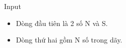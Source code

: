Input
\begin{itemize}
	\item     Dòng đầu tiên là 2 số N và S.   
	\item     Dòng thứ hai gồm N số trong dãy.   
\end{itemize}